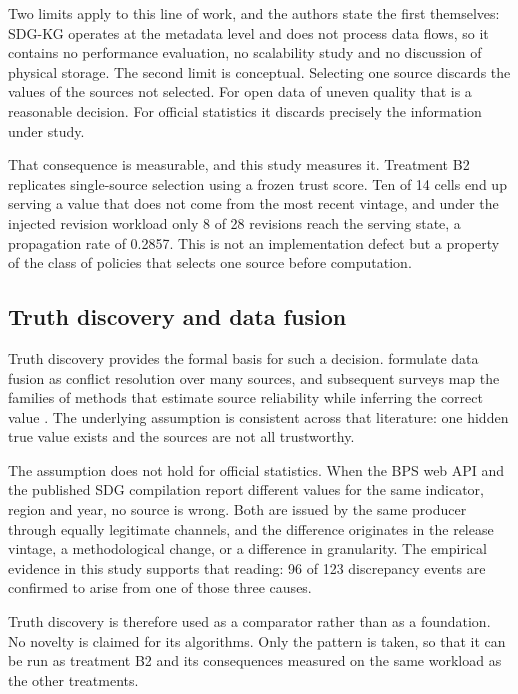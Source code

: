\documentclass[a4paper,fleqn]{cas-dc}
\begin{document}
Two limits apply to this line of work, and the authors state the first
themselves: SDG-KG operates at the metadata level and does not process data
flows, so it contains no performance evaluation, no scalability study and no
discussion of physical storage. The second limit is conceptual. Selecting one
source discards the values of the sources not selected. For open data of uneven
quality that is a reasonable decision. For official statistics it discards
precisely the information under study.

That consequence is measurable, and this study measures it. Treatment B2
replicates single-source selection using a frozen trust score. Ten of 14 cells
end up serving a value that does not come from the most recent vintage, and
under the injected revision workload only 8 of 28 revisions reach the serving
state, a propagation rate of 0.2857. This is not an implementation defect but a
property of the class of policies that selects one source before computation.

\subsection{Truth discovery and data fusion}

Truth discovery provides the formal basis for such a decision.
\citet{dong2015fusion} formulate data fusion as conflict resolution over many
sources, and subsequent surveys map the families of methods that estimate source
reliability while inferring the correct value
\citep{li2016truthsurvey,tbd2025truthsurvey}. The underlying assumption is
consistent across that literature: one hidden true value exists and the sources
are not all trustworthy.

The assumption does not hold for official statistics. When the BPS web API and
the published SDG compilation report different values for the same indicator,
region and year, no source is wrong. Both are issued by the same producer
through equally legitimate channels, and the difference originates in the
release vintage, a methodological change, or a difference in granularity. The
empirical evidence in this study supports that reading: 96 of 123 discrepancy
events are confirmed to arise from one of those three causes.

Truth discovery is therefore used as a comparator rather than as a foundation.
No novelty is claimed for its algorithms. Only the pattern is taken, so that it
can be run as treatment B2 and its consequences measured on the same workload as
the other treatments.
\end{document}
